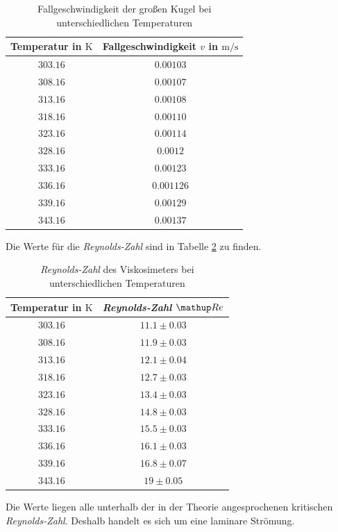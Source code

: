\begin{table}
\centering
\begin{tabular} {cc}
  \toprule
  Temperatur in $\si{\kelvin}$ & Fallgeschwindigkeit $v$ in $\si{\meter\per\second}$ \\
  \midrule
  $\num{303.16}$ & $\num{0.00103}$ \\
  $\num{308.16}$ & $\num{0.00107}$ \\
  $\num{313.16}$ & $\num{0.00108}$ \\
  $\num{318.16}$ & $\num{0.00110}$ \\
  $\num{323.16}$ & $\num{0.00114}$ \\
  $\num{328.16}$ & $\num{0.0012}$ \\
  $\num{333.16}$ & $\num{0.00123}$ \\
  $\num{336.16}$ & $\num{0.001126}$ \\
  $\num{339.16}$ & $\num{0.00129}$ \\
  $\num{343.16}$ & $\num{0.00137}$ \\
\bottomrule
\end{tabular}
\caption{Fallgeschwindigkeit der großen Kugel bei unterschiedlichen Temperaturen}
\label{tab:fall_kugel}
\end{table}

Die Werte für die \emph{Reynolds-Zahl} sind in Tabelle \ref{tab:rey_visko} %
zu finden.

\begin{table}
\centering
\begin{tabular} {cc}
  \toprule
  Temperatur in $\si{\kelvin}$ & \emph{Reynolds-Zahl} $\map{Re}$ \\
  \midrule
  $\num{303.16}$ & $\num{11.1}\pm \num{0.03}$ \\
  $\num{308.16}$ & $\num{11.9}\pm \num{0.03}$ \\
  $\num{313.16}$ & $\num{12.1}\pm \num{0.04}$ \\
  $\num{318.16}$ & $\num{12.7}\pm \num{0.03}$ \\
  $\num{323.16}$ & $\num{13.4}\pm \num{0.03}$ \\
  $\num{328.16}$ & $\num{14.8}\pm \num{0.03}$ \\
  $\num{333.16}$ & $\num{15.5}\pm \num{0.03}$ \\
  $\num{336.16}$ & $\num{16.1}\pm \num{0.03}$ \\
  $\num{339.16}$ & $\num{16.8}\pm \num{0.07}$ \\
  $\num{343.16}$ & $\num{19}\pm \num{0.05}$ \\
\bottomrule
\end{tabular}
\caption{\emph{Reynolds-Zahl} des Viskosimeters bei unterschiedlichen Temperaturen} %
\label{tab:rey_visko}
\end{table}
Die Werte liegen alle unterhalb der in der Theorie angesprochenen kritischen \emph{Reynolds-Zahl}. %
Deshalb handelt es sich um eine laminare Strömung.

